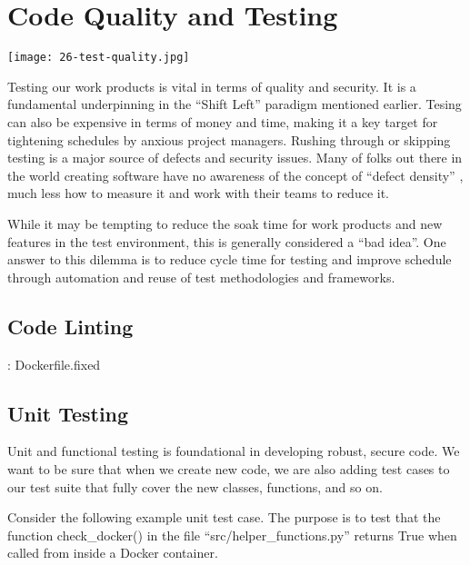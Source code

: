 \chapter{Code Quality and Testing}

\texttt{[image: 26-test-quality.jpg]}

\justifying
Testing our work products is vital in terms of quality and security. It is a fundamental underpinning in the ``Shift Left'' paradigm
mentioned earlier. Tesing can also be expensive in terms of money and time, making it a key target for tightening schedules by anxious project managers. Rushing through or skipping testing is a major source of defects and security issues. Many of
folks out there in the world creating software have no awareness of the concept of ``defect density'' ,
much less how to measure it and work with their teams to reduce it.

\justifying
While it may be tempting to reduce the soak time for work products and new features in the test environment, this is generally considered a ``bad idea''. One answer to this dilemma is to reduce cycle time for testing and
improve schedule through automation and reuse of test methodologies and frameworks.

\section{Code Linting}


\justifying
\begin{mybox}{\thetcbcounter: Dockerfile.fixed}
    
    \label{fixeddockerfile}
\end{mybox}

\section{Unit Testing}

\justifying
Unit and functional testing is foundational in developing robust, secure code. We want to be sure that when we create new code, we are also adding
test cases to our test suite that fully cover the new classes, functions, and so on.

\justifying
Consider the following example unit test case. The purpose is to test that the function check\_docker() in the file ``src/helper\_functions.py''
returns True when called from inside a Docker container.

